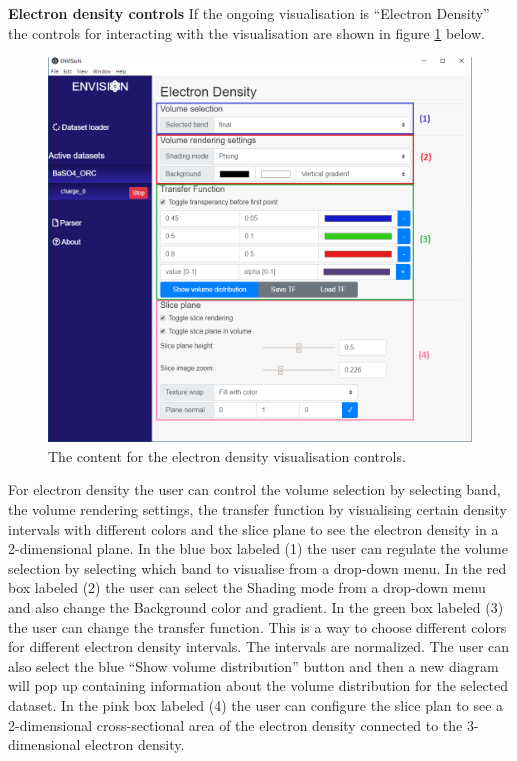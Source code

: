 \textbf{Electron density controls}
\newline
If the ongoing visualisation is ``Electron Density'' the controls for interacting with the visualisation are shown in figure \ref{fig:GUICharge} below.

\begin{figure}[H]
    \centering
    \includegraphics[scale = 0.56]{Images/GUI_Chargecontent.png}
    \caption{The content for the electron density visualisation controls.}
    \label{fig:GUICharge}
\end{figure}

For electron density the user can control the volume selection by selecting band, the volume rendering settings, the transfer function by visualising certain density intervals with different colors and the slice plane to see the electron density in a 2-dimensional plane. In the blue box labeled (1) the user can regulate the volume selection by selecting which band to visualise from a drop-down menu. In the red box labeled (2) the user can select the Shading mode from a drop-down menu and also change the Background color and gradient. In the green box labeled (3) the user can change the transfer function. This is a way to choose different colors for different electron density intervals. The intervals are normalized. The user can also select the blue ``Show volume distribution'' button and then a new diagram will pop up containing information about the volume distribution for the selected dataset. In the pink box labeled (4) the user can configure the slice plan to see a 2-dimensional cross-sectional area of the electron density connected to the 3-dimensional electron density.

